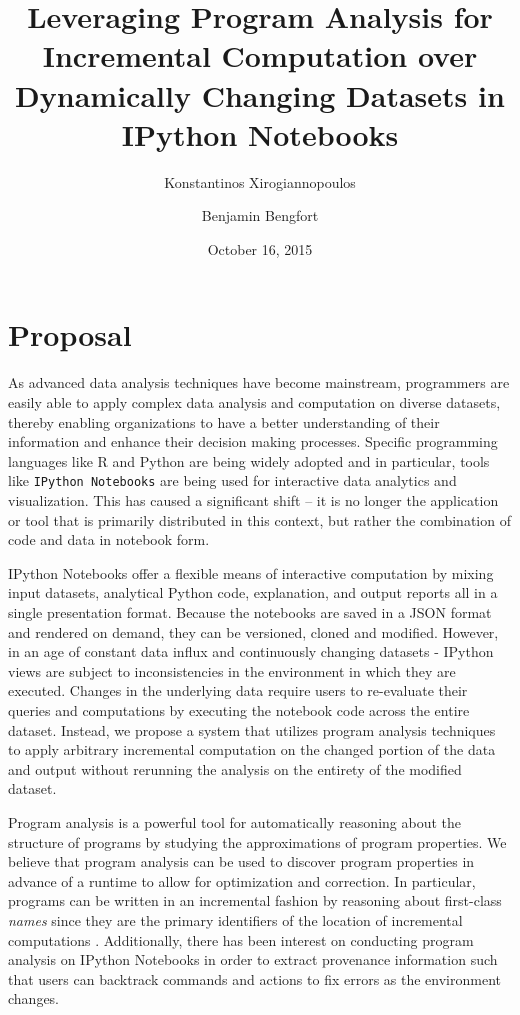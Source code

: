 \documentclass[11pt,letterpaper]{article}
\begin{document}
\title{Leveraging Program Analysis for Incremental Computation over Dynamically Changing Datasets in IPython Notebooks}
\author[ ]{Konstantinos Xirogiannopoulos}
\author[ ]{Benjamin Bengfort}

\date{October 16, 2015}

\maketitle
\section{Proposal}

As advanced data analysis techniques have become mainstream, programmers are easily able to apply complex data analysis and computation on diverse datasets, thereby enabling organizations to have a better understanding of their information and enhance their decision making processes. Specific programming languages like R and Python are being widely adopted and in particular, tools like \texttt{IPython Notebooks} \cite{perez2007ipython} are being used for interactive data analytics and visualization. This has caused a significant shift -- it is no longer the application or tool that is primarily distributed in this context, but rather the combination of code and data in notebook form.

IPython Notebooks offer a flexible means of interactive computation by mixing input datasets, analytical Python code, explanation, and output reports all in a single presentation format. Because the notebooks are saved in a JSON format and rendered on demand, they can be versioned, cloned and modified. However, in an age of constant data influx and continuously changing datasets - IPython views are subject to inconsistencies in the environment in which they are executed. Changes in the underlying data require users to re-evaluate their queries and computations by executing the notebook code across the entire dataset. Instead, we propose a system that utilizes program analysis techniques to apply arbitrary incremental computation on the changed portion of the data and output without rerunning the analysis on the entirety of the modified dataset.

Program analysis is a powerful tool for automatically reasoning about the structure of programs by studying the approximations of program properties. We believe that program analysis can be used to discover program properties in advance of a runtime to allow for optimization and correction. In particular, programs can be written in an incremental fashion by reasoning about first-class \textit{names} since they are the primary identifiers of the location of incremental computations \cite{hammer2015incremental}. Additionally, there has been interest on conducting program analysis on IPython Notebooks in order to extract provenance information \cite{pimentel2015collecting} such that users can backtrack commands and actions to fix errors as the environment changes.
\end{document}
